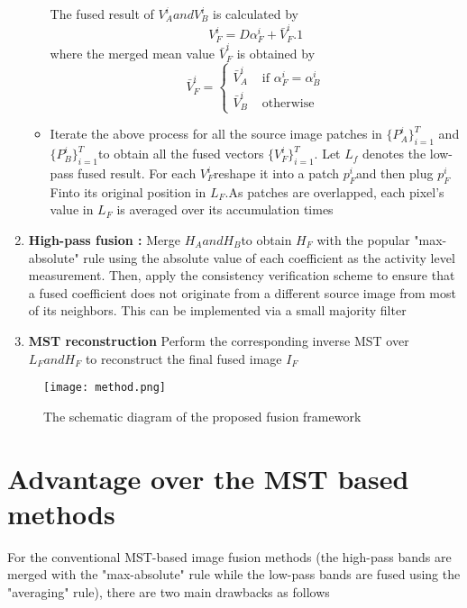\begin{enumerate}
\begin{itemize}
The fused result of \(V_{A}^{i} and V_{B}^{i}\) is calculated by \begin{equation}
V_{F}^{i}=D\alpha_{F}^{i}+\bar{V}_{F}^{i}.1
\end{equation}
where the merged mean value \(\bar{V}_{F}^{i}\) is obtained by 
\begin{equation} \label{eq:8}
\bar{V}_{F}^{i}=
\begin{cases}
\bar{V}_{A}^{i} & \text{ if }  \alpha_{F}^{i} =  \alpha_{B}^{i} \\ 
\bar{V}_{B}^{i} & \text{ otherwise } 
\end{cases}
\end{equation}
\item  Iterate the above process for all the source image patches in \(\{P_{A}^{i} \}_{i=1}^{T} \) and \(\{P_{B}^{i} \}_{i=1}^{T} \)to obtain all the fused vectors \(\{V_{F}^{i} \}_{i=1}^{T} \). Let \(L_{f}\) denotes the low-pass fused result. For each \(V_{F}^{i}\)reshape it into a patch \( p_{F}^{i}\)and then plug  \( p_{F}^{i}\)Finto its original position in \(L_{F}\).As patches are overlapped, each pixel’s value in \(L_{F}\) is averaged over its accumulation times
  \end{itemize}
   
   \item \textbf{High-pass fusion :} Merge \(H_{A} and H_{B}\)to obtain \(H_{F}\) with the popular "max-absolute"
rule using the absolute value of each coefficient as the activity level measurement. Then, apply the consistency verification scheme  to ensure that a fused coefficient does not originate from a different source image from most of its
neighbors. This can be implemented via a small majority filter

\item \textbf{MST reconstruction} Perform the corresponding inverse MST over \(L_{F} and H_{F}\) to reconstruct the final fused image \(I_{F}\)
\end{enumerate}

\begin{figure}[h!]
  \centering
  \texttt{[image: method.png]}
  \caption{The schematic diagram of the proposed fusion framework} \label{fig:method}
\end{figure}

\section{Advantage over the MST based methods}
For the conventional MST-based image fusion methods (the
high-pass bands are merged with the "max-absolute" rule while the low-pass bands are fused using the "averaging" rule), there are two main drawbacks as follows \hfill \break

